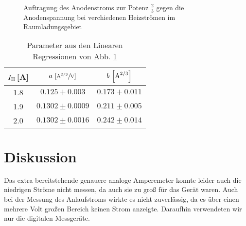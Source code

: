 \documentclass[12pt,a4paper,titlepage,headinclude,bibtotoc]{scrartcl}
\begin{document}
\begin{figure}[h]
   \centering
   \hfill
   \hfill
   \caption{Auftragung des Anodenstroms zur Potenz $\frac{2}{3}$ gegen die Anodenspannung bei verchiedenen Heizströmen im Raumladungsgebiet}
   \label{fig:raumladung}
 \end{figure}

\begin{table}[!h]
\centering
\begin{tabular}{|c|c|c|}
\hline
$I_\text H\,$[A]& $a\,\left[\sfrac{\text A^{2/3}}{\text V}\right]$	& $b\,\left[\text A^{2/3}\right]$			\\\hline\hline
1.8 		& $0.125\pm 0.003$	& $0.173\pm 0.011$	\\\hline
1.9 		& $0.1302\pm0.0009$ 	& $0.211\pm 0.005$	\\\hline
2.0 		& $0.1302\pm 0.0016$	& $0.242 \pm 0.014$	\\\hline
\end{tabular}
\caption{Parameter aus den Linearen Regressionen von Abb. \ref{fig:raumladung}}
\label{tab:ParaRaum}
\end{table}
\section{Diskussion}
\label{sec:diskussion}
Das extra bereitstehende genauere analoge Amperemeter konnte leider auch die niedrigen Ströme nicht messen, da auch sie zu groß für das Gerät waren.
Auch bei der Messung des Anlaufstroms wirkte es nicht zuverlässig, da es über einen mehrere Volt großen Bereich keinen Strom anzeigte.
Daraufhin verwendeten wir nur die digitalen Messgeräte.



\end{document}
